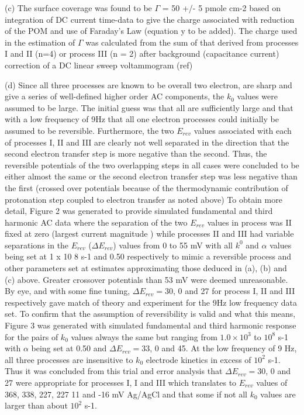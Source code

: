 \documentclass[a4paper, 12pt]{article}
\begin{document}
(c) The surface coverage was found to be $\Gamma$ = 50 +/- 5 pmole cm-2 based on 
integration of DC current time-data to give the charge associated with reduction 
of the POM and use of Faraday’s Law (equation y to be added). The charge used in 
the estimation of $\Gamma$ was calculated from the sum of that derived from 
processes I and II (n=4) or process   III (n = 2) after   background 
(capacitance current) correction of a DC linear sweep voltammogram (ref)

(d) Since all three processes are known to be overall two electron, are sharp 
and give a series of well-defined higher order AC components, the $k_0$ values were 
assumed to be large. The initial guess was that all are sufficiently large and 
that with a low frequency of 9Hz that all one electron processes could initially 
be assumed to be reversible.  Furthermore, the two $E_{rev}$ values associated with 
each of processes I, II and III are clearly not well separated in the direction 
that the second electron transfer step is more negative than the second.  Thus, 
the reversible potentials of the two  overlapping  steps in all cases were 
concluded to be either almost the same  or the second electron transfer step was 
less negative  than the first (crossed over potentials because of the 
thermodynamic contribution of protonation step coupled to electron transfer as 
noted above) To obtain more detail, Figure 2 was generated to provide simulated 
fundamental and third harmonic AC  data where the separation of the two $E_{rev}$ 
values in process was II fixed at zero (largest current magnitude ) while  
processes  II and III had variable separations in the $E_{rev}$ ($\Delta E_{rev}$) 
values from 0 to 55 mV with all $k^0$ and $\alpha$  values being set at 1 x 10 8  
s-1  and 0.50 respectively to mimic a reversible process  and other parameters 
set at estimates approximating those deduced in (a), (b) and (c) above.  Greater 
crossover potentials   than 53 mV were deemed unreasonable. By eye, and with 
some fine tuning, $\Delta E_{rev} = 30$, 0 and 27  for process I, II and III 
respectively gave match of theory and experiment for the 9Hz low frequency data 
set. To confirm that the assumption of reversibility is valid and what this 
means, Figure 3  was generated with  simulated fundamental and third harmonic 
response for the pairs of $k_0$ values always the same but ranging from $1.0 \times 
10^3$ to $10^8$  s-1  with $\alpha$ being set at 0.50 and $\Delta E_{rev} = 33$, 
0 and 45.  At the low frequency of 9 Hz, all three processes are insensitive to 
$k_0$ electrode kinetics in excess of $10^2$ s-1. Thus it was concluded from 
this trial and error analysis that $\Delta E_{rev} = 30$, 0 and 27 were 
appropriate for processes I, I and III which translates to $E_{rev}$ values of 
368, 338, 227, 227 11 and -16 mV Ag/AgCl and that some if not all $k_0$ values are 
larger than about $10^2$ s-1.   
\end{document}
